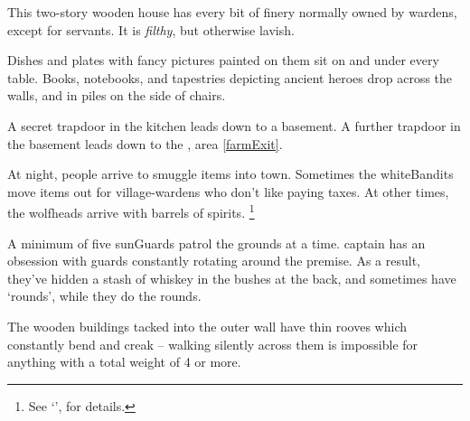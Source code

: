 \begin{multicols}{2}

This two-story wooden house has every bit of finery normally owned by \glspl{warden}, except for servants.
It is \emph{filthy}, but otherwise lavish.

\begin{boxtext}
  Dishes and plates with fancy pictures painted on them sit on and under every table.
  Books, notebooks, and tapestries depicting ancient heroes drop across the walls, and in piles on the side of chairs.
\end{boxtext}

A secret trapdoor in the kitchen leads down to a basement.
A further trapdoor in the basement leads down to the , area \vref{farmExit}.

At night, people arrive to smuggle items into \gls{town}.
Sometimes the \gls{whiteBandits} move items out for \gls{village}-\glspl{warden} who don't like paying taxes.
At other times, the \glspl{wolfhead} arrive with barrels of spirits.%
\footnote{See `',  for details.}



A minimum of five \glspl{sunGuard} patrol the grounds at a time.
\Gls{captain} has an obsession with guards constantly rotating around the premise.
As a result, they've hidden a stash of whiskey in the bushes at the back, and sometimes have `rounds', while they do the rounds.

The wooden buildings tacked into the outer wall have thin rooves which constantly bend and creak -- walking silently across them is impossible for anything with a total \gls{weight} of 4 or more.


\end{multicols}
